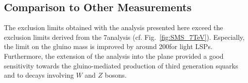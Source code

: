 \subsection{Comparison to Other Measurements}
\label{subsec:RA2_comp}
The exclusion limits obtained with the analysis presented here exceed the exclusion limits derived from the 7\tev analysis (cf. Fig.~\ref{fig:SMS_7TeV}). Especially, the limit on the gluino mass is improved by around 200\gev for light LSPs. Furthermore, the extension of the analysis into the \NJets plane provided a good sensitivity towards the gluino-mediated production of third generation squarks and to decays involving $W$ and $Z$ bosons.

\begin{figure}[!h]
  \centering
{}


\end{figure}
